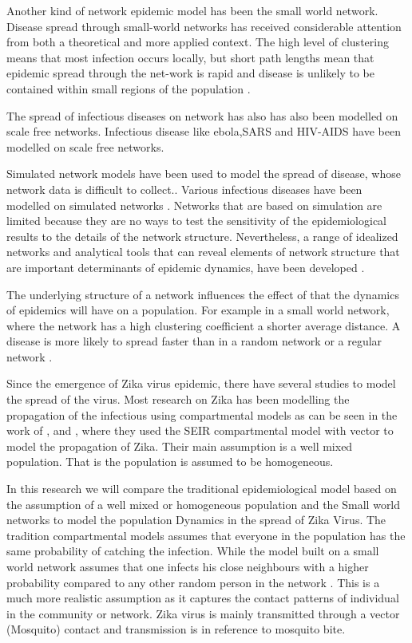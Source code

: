 Another kind of network epidemic model has been the small world network. Disease spread through small-world networks has received considerable attention from both a theoretical and more applied context. The high level of clustering means that most infection occurs locally, but short path lengths mean that epidemic spread through the net-work is rapid and disease is unlikely to be contained within small regions of the population \citep{watts1998collective}.

The spread of infectious diseases on network has also has also been modelled on scale free networks. Infectious disease like ebola,SARS and HIV-AIDS have been modelled on scale free networks. \citep{morita2016six}


Simulated network models have been used to model the spread of disease, whose network data is difficult to collect.. Various infectious diseases have been modelled on simulated networks \citep{keeling2005networks}. Networks that are based on simulation are limited because they are no ways to test the sensitivity of the epidemiological results to the details of the network structure. Nevertheless, a range of idealized networks and analytical tools that can reveal elements of network structure that are important determinants of epidemic dynamics, have been developed \citep{keeling2005networks}. 


 The underlying structure of a network influences  the effect of that the dynamics of epidemics will have on a population. For example in a small world network, where the network has a high clustering coefficient a shorter average distance. A disease is more likely to spread faster than in a random network or a regular network \citep{watts1998collective}.


Since the emergence of Zika virus epidemic, there have several studies to model the spread of the virus. Most research on Zika has been modelling the propagation of the infectious using compartmental models as can be seen in the work of \cite{1}, \cite{2} and \cite{3}, where they used the SEIR compartmental model with vector to model the propagation of Zika. Their main assumption is a well mixed population. That is the population is assumed to be homogeneous.

In this research we will compare the traditional epidemiological model based on the  assumption of a well mixed or homogeneous population and the Small world networks to model the population Dynamics in the spread of Zika Virus. The tradition compartmental models assumes that everyone in the population has the same probability of catching the infection. While  the model built on a small world network assumes that  one infects his close neighbours with a higher probability compared to any other random person in the network \citep{newman2002random}. This is a much more realistic assumption as it captures the contact patterns of individual in the community or network. Zika virus is mainly transmitted through a vector (Mosquito) contact and transmission is in reference to mosquito bite.



